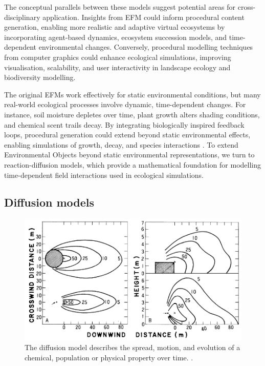 The conceptual parallels between these models suggest potential areas for cross-disciplinary application. Insights from EFM could inform procedural content generation, enabling more realistic and adaptive virtual ecosystems by incorporating agent-based dynamics, ecosystem succession models, and time-dependent environmental changes. Conversely, procedural modelling techniques from computer graphics could enhance ecological simulations, improving visualisation, scalability, and user interactivity in landscape ecology and biodiversity modelling.

The original EFMs work effectively for static environmental conditions, but many real-world ecological processes involve dynamic, time-dependent changes. For instance, soil moisture depletes over time, plant growth alters shading conditions, and chemical scent trails decay. By integrating biologically inspired feedback loops, procedural generation could extend beyond static environmental effects, enabling simulations of growth, decay, and species interactions \cite{Okubo2001,Wojtek2022}. To extend Environmental Objects beyond static environmental representations, we turn to reaction-diffusion models, which provide a mathematical foundation for modelling time-dependent field interactions used in ecological simulations.





\subsection{Diffusion models}

\begin{figure}[H]
\centering
\includegraphics[]{diffusion-example-Okubo2001.png}
\caption{The diffusion model describes the spread, motion, and evolution of a chemical, population or physical property over time. \cite{Okubo2001}.}
\label{fig:diffusion-model-teaser}
\end{figure}

